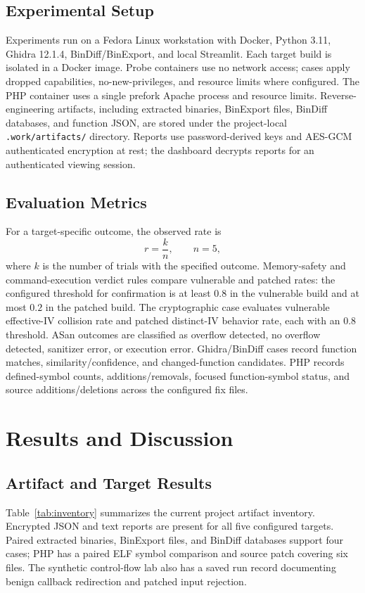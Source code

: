 \documentclass[conference]{IEEEtran}
\begin{document}
\subsection{Experimental Setup}
Experiments run on a Fedora Linux workstation with Docker, Python 3.11, Ghidra 12.1.4, BinDiff/BinExport, and local Streamlit. Each target build is isolated in a Docker image. Probe containers use no network access; cases apply dropped capabilities, no-new-privileges, and resource limits where configured. The PHP container uses a single prefork Apache process and resource limits. Reverse-engineering artifacts, including extracted binaries, BinExport files, BinDiff databases, and function JSON, are stored under the project-local \texttt{.work/artifacts/} directory. Reports use password-derived keys and AES-GCM authenticated encryption at rest; the dashboard decrypts reports for an authenticated viewing session.

\subsection{Evaluation Metrics}
For a target-specific outcome, the observed rate is
\begin{equation}
  r = \frac{k}{n}, \qquad n=5,
\end{equation}
where $k$ is the number of trials with the specified outcome. Memory-safety and command-execution verdict rules compare vulnerable and patched rates: the configured threshold for confirmation is at least $0.8$ in the vulnerable build and at most $0.2$ in the patched build. The cryptographic case evaluates vulnerable effective-IV collision rate and patched distinct-IV behavior rate, each with an $0.8$ threshold. ASan outcomes are classified as overflow detected, no overflow detected, sanitizer error, or execution error. Ghidra/BinDiff cases record function matches, similarity/confidence, and changed-function candidates. PHP records defined-symbol counts, additions/removals, focused function-symbol status, and source additions/deletions across the configured fix files.

\section{Results and Discussion}
\subsection{Artifact and Target Results}
Table~\ref{tab:inventory} summarizes the current project artifact inventory. Encrypted JSON and text reports are present for all five configured targets. Paired extracted binaries, BinExport files, and BinDiff databases support four cases; PHP has a paired ELF symbol comparison and source patch covering six files. The synthetic control-flow lab also has a saved run record documenting benign callback redirection and patched input rejection.
\end{document}
